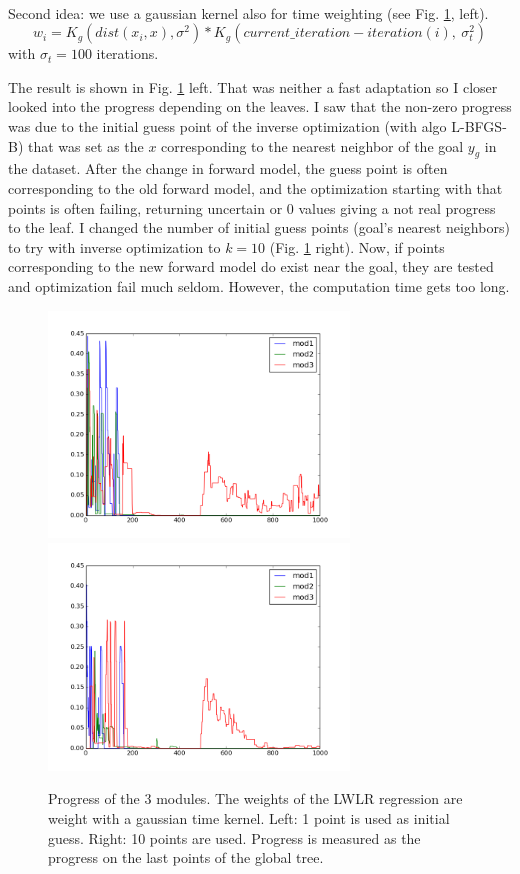 \documentclass[12pt]{article}
\begin{document}
		\paragraph{}
		Second idea: we use a gaussian kernel also for time weighting (see Fig. \ref{gt}, left).
		$$ w_i = K_g(dist(x_i, x), \sigma^2) * K_g(current\_iteration - iteration(i),~\sigma_t^2)$$
		with $\sigma_t = 100$ iterations.
		
		The result is shown in Fig. \ref{gt} left.
		That was neither a fast adaptation so I closer looked into the progress depending on the leaves. 
		I saw that the non-zero progress was due to the initial guess point of the inverse optimization (with algo L-BFGS-B) that was set as the $x$ corresponding to the nearest neighbor of the goal $y_g$ in the dataset.
		After the change in forward model, the guess point is often corresponding to the old forward model, and the optimization starting with that points is often failing, returning uncertain or 0 values giving a not real progress to the leaf.
		I changed the number of initial guess points (goal's nearest neighbors) to try with inverse optimization to $k=10$ (Fig. \ref{gt} right).
		Now, if points corresponding to the new forward model do exist near the goal, they are tested and optimization fail much seldom.
		However, the computation time gets too long.
		
		\begin{figure}[H]
			\centering
			\includegraphics[width=8cm]{./include/NSLWLR-opt_k-initial=1.png}
			\includegraphics[width=8cm]{./include/NSLWLR-opt_k-initial=10.png}
			\caption{Progress of the 3 modules. The weights of the LWLR regression are weight with a gaussian time kernel. Left: 1 point is used as initial guess. Right: 10 points are used. Progress is measured as the progress on the last points of the global tree.}
			\label{gt}
		\end{figure}
	
\end{document}
